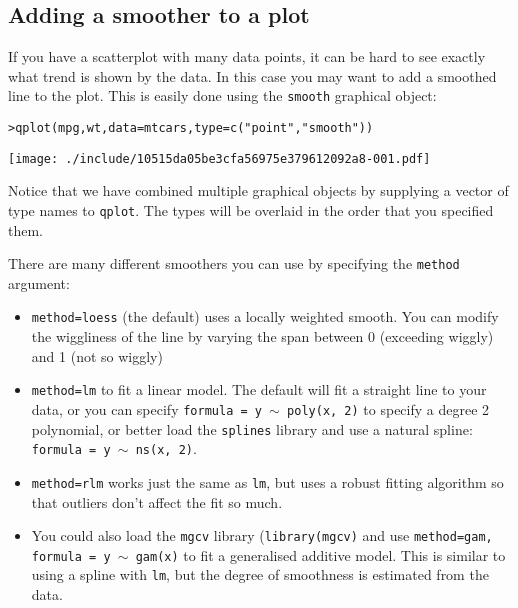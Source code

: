 \subsection{Adding a smoother to a plot}\label{sub:smooth}

If you have a scatterplot with many data points, it can be hard to see exactly what trend is shown by the data.  In this case you may want to add a smoothed line to the plot.  This is easily done using the {\tt smooth} graphical object:

\begin{alltt}
> qplot(mpg, wt, data = mtcars, type = c("point", "smooth"))
\end{alltt}
\texttt{[image: ./include/10515da05be3cfa56975e379612092a8-001.pdf]}
\begin{alltt}

\end{alltt}%

Notice that we have combined multiple graphical objects by supplying a vector of type names to {\tt qplot}.  The types will be overlaid in the order that you specified them.

There are many different smoothers you can use by specifying the {\tt method} argument:

\begin{itemize}
	\item {\tt method=loess} (the default) uses a locally weighted smooth.  You can modify the wiggliness of the line by varying the span between 0 (exceeding wiggly) and 1 (not so wiggly)

	\item {\tt method=lm} to fit a linear model.  The default will fit a straight line to your data, or you can specify {\tt formula = y $\sim$ poly(x, 2)} to specify a degree 2 polynomial, or better load the {\tt splines} library and use a natural spline: {\tt formula = y $\sim$ ns(x, 2)}.

	\item {\tt method=rlm} works just the same as {\tt lm}, but uses a robust fitting algorithm so that outliers don't affect the fit so much.

	\item You could also load the {\tt mgcv} library ({\tt library(mgcv)} and use {\tt method=gam, formula = y $\sim$ gam(x)} to fit a generalised additive model.  This is similar to using a spline with {\tt lm}, but the degree of smoothness is estimated from the data.
\end{itemize}

